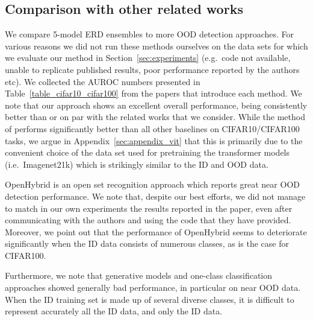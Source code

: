 \vspace{-0.3cm}
\subsection{Comparison with other related works}
\label{sec:appendix_cifar10_cifar100}

We compare 5-model ERD ensembles to more OOD detection approaches. For various
reasons we did not run these methods ourselves on the data sets for which we
evaluate our method in Section~\ref{sec:experiments} (e.g.\ code not available,
unable to replicate published results, poor performance reported by the authors
etc). We collected the AUROC numbers presented in
Table~\ref{table_cifar10_cifar100} from the papers that introduce each method.
We note that our approach shows an excellent overall performance, being
consistently better than or on par with the related works that we consider.
While the method of \citet{fort2021} performs significantly better than all
other baselines on CIFAR10/CIFAR100 tasks, we argue in
Appendix~\ref{sec:appendix_vit} that this is primarily due to the convenient
choice of the data set used for pretraining the transformer models (i.e.\
Imagenet21k) which is strikingly similar to the ID and OOD data.


OpenHybrid \citep{openhybrid2020} is an open set recognition approach which
reports great near OOD detection performance. We note that, despite our best
efforts, we did not manage to match in our own experiments the results reported
in the paper, even after communicating with the authors and using the code that
they have provided. Moreover, we point out that the performance of OpenHybrid
seems to deteriorate significantly when the ID data consists of numerous
classes, as is the case for CIFAR100.

Furthermore, we note that generative models \citep{nalisnick, 
ganomaly2018} and one-class classification approaches \citep{Ruff2020, Tack2020,
sohn2021} showed generally bad performance, in particular on near OOD data. When
the ID training set is made up of several diverse classes, it is difficult to
represent accurately all the ID data, and only the ID data.

